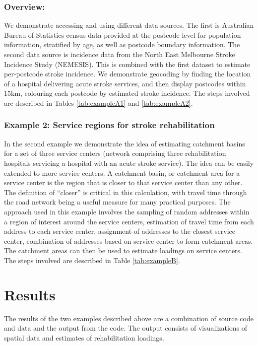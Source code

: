 \documentclass[utf8]{frontiersHLTH}
\begin{document}
\subsubsection{Overview:}\label{overview} 
We demonstrate accessing and using different data sources. The first
is Australian Bureau of Statistics census data provided at the
postcode level for population information, stratified by age, as well
as postcode boundary information. The second data source is incidence
data from the North East Melbourne Stroke Incidence Study
(NEMESIS)\cite{thrift_stroke_2000}. This is combined with the first
dataset to estimate per-postcode stroke incidence. We demonstrate
geocoding by finding the location of a hospital delivering acute
stroke services, and then display postcodes within 15km, colouring
each postcode by estimated stroke incidence. The steps involved are
described in Tables \ref{tab:exampleA1} and \ref{tab:exampleA2}.

\subsubsection{Example 2: Service regions for stroke rehabilitation}\label{example-2-service-regions-for-stroke-rehabilitation} 
In the second example we demonstrate the idea of estimating catchment
basins for a set of three service centers (network comprising three
rehabilitation hospitals servicing a hospital with an acute stroke
service). The idea can be easily extended to more service centers. A
catchment basin, or catchment area for a service center is the region
that is closer to that service center than any other. The definition
of ``closer'' is critical in this calculation, with travel time
through the road network being a useful measure for many practical
purposes. The approach used in this example involves the sampling of
random addresses within a region of interest around the service
centers, estimation of travel time from each address to each service
center, assignment of addresses to the closest service center,
combination of addresses based on service center to form catchment
areas. The catchment areas can then be used to estimate loadings on
service centers. The steps involved are described in Table
\ref{tab:exampleB}.

\section{Results}

The results of the two examples described above are a combination of
source code and data and the output from the code. The output consists
of visualizations of spatial data and estimates of rehabilitation
loadings.
\end{document}
